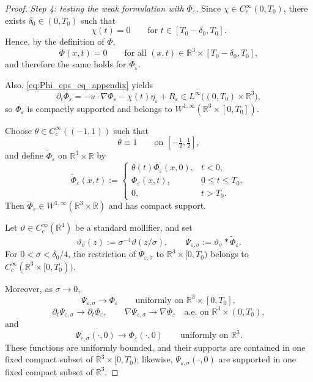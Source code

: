 \documentclass[reqno,11pt]{amsart}
\begin{document}
\begin{proof}
\smallskip
\noindent\emph{Step 4: testing the weak formulation with $\Phi_\varepsilon$.}
Since $\chi\in C_c^\infty(0,T_0)$, there exists $\delta_0\in(0,T_0)$ such that
\[
\chi(t)=0
\qquad\text{for }t\in[T_0-\delta_0,T_0].
\]
Hence, by the definition of $\Phi$,
\[
\Phi(x,t)=0
\qquad\text{for all }(x,t)\in\mathbb R^3\times[T_0-\delta_0,T_0],
\]
and therefore the same holds for $\Phi_\varepsilon$.

Also, \eqref{eq:Phi_eps_eq_appendix} yields
\[
\partial_t\Phi_\varepsilon
=
-u\cdot\nabla\Phi_\varepsilon-\chi(t)\eta_\varepsilon+R_\varepsilon
\in L^\infty\bigl((0,T_0)\times\mathbb R^3\bigr),
\]
so $\Phi_\varepsilon$ is compactly supported and belongs to
$W^{1,\infty}(\mathbb R^3\times[0,T_0])$.

Choose $\theta\in C_c^\infty((-1,1))$ such that
\[
\theta\equiv 1
\qquad\text{on }[-\tfrac12,\tfrac12],
\]
and define $\widetilde{\Phi}_\varepsilon$ on $\mathbb R^3\times\mathbb R$ by
\[
\widetilde{\Phi}_\varepsilon(x,t):=
\begin{cases}
\theta(t)\Phi_\varepsilon(x,0), & t<0,\\[1mm]
\Phi_\varepsilon(x,t), & 0\le t\le T_0,\\[1mm]
0, & t>T_0.
\end{cases}
\]
Then $\widetilde{\Phi}_\varepsilon\in W^{1,\infty}(\mathbb R^3\times\mathbb R)$ and has
compact support.

Let $\vartheta\in C_c^\infty(\mathbb R^4)$ be a standard mollifier, and set
\[
\vartheta_\sigma(z):=\sigma^{-4}\vartheta(z/\sigma),
\qquad
\Psi_{\varepsilon,\sigma}:=\vartheta_\sigma*\widetilde{\Phi}_\varepsilon.
\]
For $0<\sigma<\delta_0/4$, the restriction of $\Psi_{\varepsilon,\sigma}$ to
$\mathbb R^3\times[0,T_0)$ belongs to
$C_c^\infty(\mathbb R^3\times[0,T_0))$.

Moreover, as $\sigma\to0$,
\[
\Psi_{\varepsilon,\sigma}\to \Phi_\varepsilon
\qquad\text{uniformly on }\mathbb R^3\times[0,T_0],
\]
\[
\partial_t\Psi_{\varepsilon,\sigma}\to \partial_t\Phi_\varepsilon,
\qquad
\nabla\Psi_{\varepsilon,\sigma}\to \nabla\Phi_\varepsilon
\quad\text{a.e. on }\mathbb R^3\times(0,T_0),
\]
and
\[
\Psi_{\varepsilon,\sigma}(\cdot,0)\to \Phi_\varepsilon(\cdot,0)
\qquad\text{uniformly on }\mathbb R^3.
\]
These functions are uniformly bounded, and their supports are contained in one fixed compact
subset of $\mathbb R^3\times[0,T_0)$; likewise,
$\Psi_{\varepsilon,\sigma}(\cdot,0)$ are supported in one fixed compact subset of
$\mathbb R^3$.


\end{proof}
\end{document}
